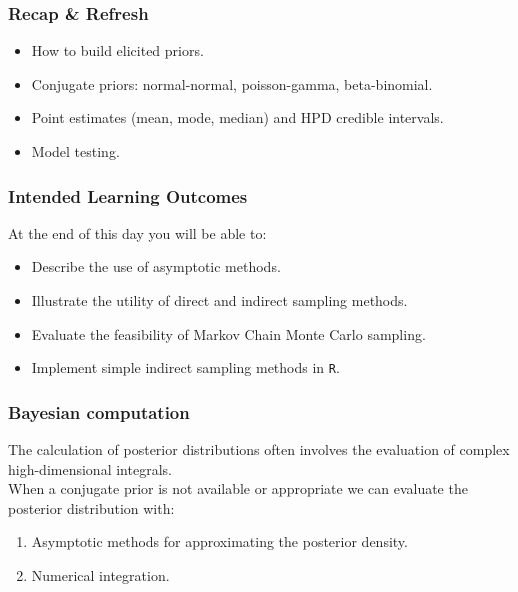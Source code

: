 \documentclass{beamer}
\newcommand{\1}{\ensuremath{\mathbf{1}}}
\begin{document}
%
%
%
\begin{frame}\frametitle{Recap \& Refresh}
	\begin{itemize}
		\item How to build elicited priors.
		\item Conjugate priors: normal-normal, poisson-gamma, beta-binomial.
		\item Point estimates (mean, mode, median) and HPD credible intervals.
		\item Model testing.
	\end{itemize}
\end{frame}
%
%
%
\begin{frame}\frametitle{Intended Learning Outcomes}
	At the end of this day you will be able to:
	\begin{itemize}
		\item Describe the use of asymptotic methods.
		\item Illustrate the utility of direct and indirect sampling methods.
		\item Evaluate the feasibility of Markov Chain Monte Carlo sampling.
		\item Implement simple indirect sampling methods in \texttt{R}.
	\end{itemize}
\end{frame}
%
%
%
\begin{frame}\frametitle{Bayesian computation}
	The calculation of posterior distributions often involves the evaluation of complex high-dimensional integrals.\\[2ex]
	When a conjugate prior is not available or appropriate we can evaluate the posterior distribution with:
	\begin{enumerate}
		\item Asymptotic methods for approximating the posterior density.
		\item Numerical integration.
	\end{enumerate}
\end{frame}
\end{document}
